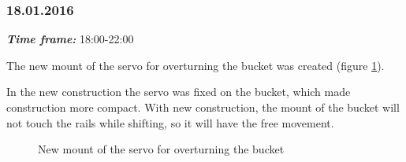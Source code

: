\subsubsection{18.01.2016}
\textit{\textbf{Time frame:}} 18:00-22:00 

The new mount of the servo for overturning the bucket was created (figure \ref{Bucket1.3}). 

In the new construction the servo was fixed on the bucket, which made construction more compact. With new construction, the mount of the bucket will not touch the rails while shifting, so it will have the free movement.

\begin{figure}[H]
	\begin{minipage}[h]{1\linewidth}
		\caption{New mount of the servo for overturning the bucket}
		\label{Bucket1.3}
	\end{minipage}
\end{figure}
